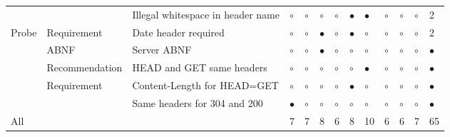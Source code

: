 \begin{tabular}{lllllllllllll}
    &             & Illegal whitespace in header name &    $\circ$ &    $\circ$ &    $\circ$ &    $\circ$ &  $\bullet$ &     $\bullet$ &    $\circ$ &    $\circ$ &    $\circ$ &          2 \\
Probe & Requirement & Date header required &    $\circ$ &    $\circ$ &  $\bullet$ &    $\circ$ &  $\bullet$ &       $\circ$ &    $\circ$ &    $\circ$ &    $\circ$ &          2 \\
    & ABNF & Server ABNF &    $\circ$ &    $\circ$ &  $\bullet$ &    $\circ$ &    $\circ$ &       $\circ$ &    $\circ$ &    $\circ$ &    $\circ$ &  $\bullet$ \\
\Multi{} & Recommendation & HEAD and GET same headers &    $\circ$ &    $\circ$ &    $\circ$ &    $\circ$ &    $\circ$ &     $\bullet$ &    $\circ$ &    $\circ$ &    $\circ$ &  $\bullet$ \\
    & Requirement & Content-Length for HEAD=GET &    $\circ$ &    $\circ$ &    $\circ$ &    $\circ$ &  $\bullet$ &       $\circ$ &    $\circ$ &    $\circ$ &    $\circ$ &  $\bullet$ \\
    &             & Same headers for 304 and 200 &  $\bullet$ &    $\circ$ &    $\circ$ &    $\circ$ &    $\circ$ &       $\circ$ &    $\circ$ &    $\circ$ &    $\circ$ &  $\bullet$ \\
All &             &                              &          7 &          7 &          8 &          6 &          8 &            10 &          6 &          6 &          7 &         65 \\
\bottomrule
\end{tabular}
